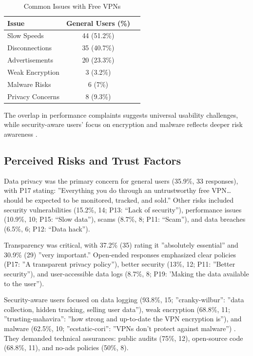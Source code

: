 \documentclass[11pt,a4paper]{article}
\begin{document}
\begin{table}[ht]
    \centering
    \caption{Common Issues with Free VPNs}
    \begin{tabular}{lcc}
        \toprule
        \textbf{Issue} & \textbf{General Users (\%)}\\
        \midrule
        Slow Speeds & 44 (51.2\%) \\
        Disconnections & 35 (40.7\%) \\
        Advertisements & 20 (23.3\%) \\
        Weak Encryption & 3 (3.2\%)\\
        Malware Risks & 6 (7\%) \\
        Privacy Concerns & 8 (9.3\%) \\
        \bottomrule
    \end{tabular}
    \label{tab:issues}
\end{table}

The overlap in performance complaints suggests universal usability challenges, while security-aware users’ focus on encryption and malware reflects deeper risk awareness \citep{Wilson2020, Ramesh2022}.

\subsection{Perceived Risks and Trust Factors}
Data privacy was the primary concern for general users (35.9\%, 33 responses), with P17 stating: ''Everything you do through an untrustworthy free VPN… should be expected to be monitored, tracked, and sold.'' Other risks included security vulnerabilities (15.2\%, 14; P13: ``Lack of security''), performance issues (10.9\%, 10; P15: ``Slow data''), scams (8.7\%, 8; P11: ``Scam''), and data breaches (6.5\%, 6; P12: ``Data hack'').

Transparency was critical, with 37.2\% (35) rating it ''absolutely essential'' and 30.9\% (29) ''very important.'' Open-ended responses emphasized clear policies (P17: ''A transparent privacy policy''), better security (13\%, 12; P11: ''Better security''), and user-accessible data logs (8.7\%, 8; P19: 'Making the data available to the user'').

Security-aware users focused on data logging (93.8\%, 15; ''cranky-wilbur'': ''data collection, hidden tracking, selling user data''), weak encryption (68.8\%, 11; ''trusting-mahavira'': ''how strong and up-to-date the VPN encryption is''), and malware (62.5\%, 10; ''ecstatic-cori'': ''VPNs don’t protect against malware'') \citep{Shetty2025}. They demanded technical assurances: public audits (75\%, 12), open-source code (68.8\%, 11), and no-ads policies (50\%, 8).
\end{document}
